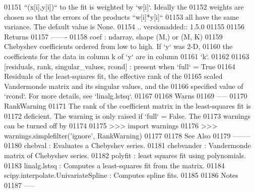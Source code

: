 \begin{DoxyCode}
01151 \textcolor{stringliteral}{        ``(x[i],y[i])`` to the fit is weighted by `w[i]`. Ideally the}
01152 \textcolor{stringliteral}{        weights are chosen so that the errors of the products ``w[i]*y[i]``}
01153 \textcolor{stringliteral}{        all have the same variance.  The default value is None.}
01154 \textcolor{stringliteral}{        .. versionadded:: 1.5.0}
01155 \textcolor{stringliteral}{}
01156 \textcolor{stringliteral}{    Returns}
01157 \textcolor{stringliteral}{    -------}
01158 \textcolor{stringliteral}{    coef : ndarray, shape (M,) or (M, K)}
01159 \textcolor{stringliteral}{        Chebyshev coefficients ordered from low to high. If `y` was 2-D,}
01160 \textcolor{stringliteral}{        the coefficients for the data in column k  of `y` are in column}
01161 \textcolor{stringliteral}{        `k`.}
01162 \textcolor{stringliteral}{}
01163 \textcolor{stringliteral}{    [residuals, rank, singular\_values, rcond] : present when `full` = True}
01164 \textcolor{stringliteral}{        Residuals of the least-squares fit, the effective rank of the}
01165 \textcolor{stringliteral}{        scaled Vandermonde matrix and its singular values, and the}
01166 \textcolor{stringliteral}{        specified value of `rcond`. For more details, see `linalg.lstsq`.}
01167 \textcolor{stringliteral}{}
01168 \textcolor{stringliteral}{    Warns}
01169 \textcolor{stringliteral}{    -----}
01170 \textcolor{stringliteral}{    RankWarning}
01171 \textcolor{stringliteral}{        The rank of the coefficient matrix in the least-squares fit is}
01172 \textcolor{stringliteral}{        deficient. The warning is only raised if `full` = False.  The}
01173 \textcolor{stringliteral}{        warnings can be turned off by}
01174 \textcolor{stringliteral}{}
01175 \textcolor{stringliteral}{        >>> import warnings}
01176 \textcolor{stringliteral}{        >>> warnings.simplefilter('ignore', RankWarning)}
01177 \textcolor{stringliteral}{}
01178 \textcolor{stringliteral}{    See Also}
01179 \textcolor{stringliteral}{    --------}
01180 \textcolor{stringliteral}{    chebval : Evaluates a Chebyshev series.}
01181 \textcolor{stringliteral}{    chebvander : Vandermonde matrix of Chebyshev series.}
01182 \textcolor{stringliteral}{    polyfit : least squares fit using polynomials.}
01183 \textcolor{stringliteral}{    linalg.lstsq : Computes a least-squares fit from the matrix.}
01184 \textcolor{stringliteral}{    scipy.interpolate.UnivariateSpline : Computes spline fits.}
01185 \textcolor{stringliteral}{}
01186 \textcolor{stringliteral}{    Notes}
01187 \textcolor{stringliteral}{    -----}

\end{DoxyCode}

